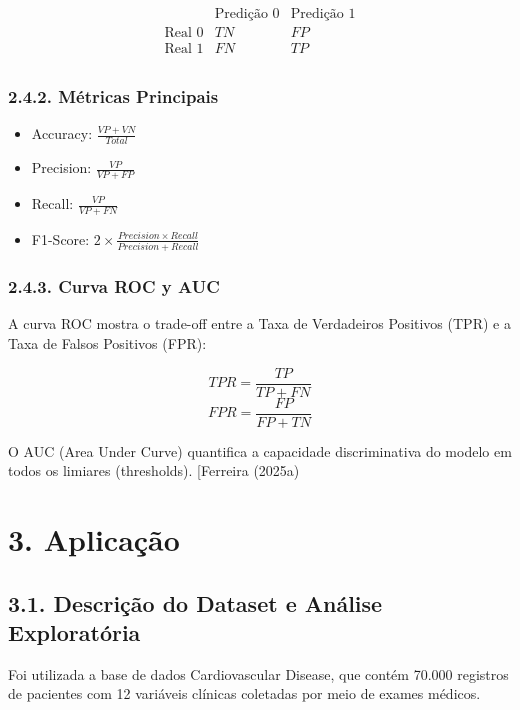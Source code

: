 \documentclass[
  oneclumn]{article}
\begin{document}
\[
\begin{array}{c|cc}
 & \text{Predição 0} & \text{Predição 1} \\
\hline
\text{Real 0} & TN & FP \\
\text{Real 1} & FN & TP \\
\end{array}
\]

\subsubsection{2.4.2. Métricas Principais}\label{muxe9tricas-principais}

\begin{itemize}
\item
  Accuracy: \(\frac{VP + VN}{Total}\)
\item
  Precision: \(\frac{VP}{VP + FP}\)
\item
  Recall: \(\frac{VP}{VP + FN}\)
\item
  F1-Score:
  \(2\times\frac{Precision \times Recall}{Precision + Recall}\)
\end{itemize}

\subsubsection{2.4.3. Curva ROC y AUC}\label{curva-roc-y-auc}

A curva ROC mostra o trade-off entre a Taxa de Verdadeiros Positivos
(TPR) e a Taxa de Falsos Positivos (FPR):

\[TPR = \frac{TP}{TP + FN}\] \[FPR = \frac{FP}{FP + TN}\]

O AUC (Area Under Curve) quantifica a capacidade discriminativa do
modelo em todos os limiares (thresholds). {[}Ferreira (2025a)

\section{3. Aplicação}\label{aplicauxe7uxe3o}

\subsection{3.1. Descrição do Dataset e Análise
Exploratória}\label{descriuxe7uxe3o-do-dataset-e-anuxe1lise-exploratuxf3ria}

Foi utilizada a base de dados Cardiovascular Disease, que contém 70.000
registros de pacientes com 12 variáveis clínicas coletadas por meio de
exames médicos.
\end{document}

